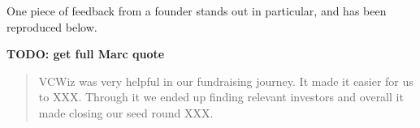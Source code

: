 One piece of feedback from a founder stands out in particular, and has been reproduced below.

\textbf{TODO: get full Marc quote}

\begin{quote}
VCWiz was very helpful in our fundraising journey. It made it easier for us to XXX. Through it we ended up finding relevant investors and overall it made closing our seed round XXX.
\end{quote}

